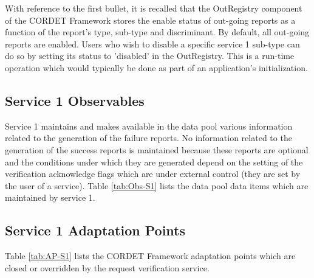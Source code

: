 \documentclass{pnp_article}
\begin{document}
With reference to the first bullet, it is recalled that the OutRegistry component of the CORDET Framework stores the enable status of out-going reports as a function of the report's type, sub-type and discriminant. By default, all out-going reports are enabled. Users who wish to disable a specific service 1 sub-type can do so by setting its status to 'disabled' in the OutRegistry. This is a run-time operation which would typically be done as part of an application's initialization.

\newpage
{}
\newpage
{}
\newpage
{}
\newpage
{}


\subsection{Service 1 Observables}\label{sec:serv1Obs}
Service 1 maintains and makes available in the data pool various information related to the generation of the failure reports. No information related to the generation of the success reports is maintained because these reports are optional and the conditions under which they are generated depend on the setting of the verification acknowledge flags which are under external control (they are set by the user of a service). Table \ref{tab:Obs-S1} lists the data pool data items which are maintained by service 1.



\subsection{Service 1 Adaptation Points}\label{sec:serv1AP}
Table \ref{tab:AP-S1} lists the CORDET Framework adaptation points which are closed or overridden by the request verification service. 
\end{document}

